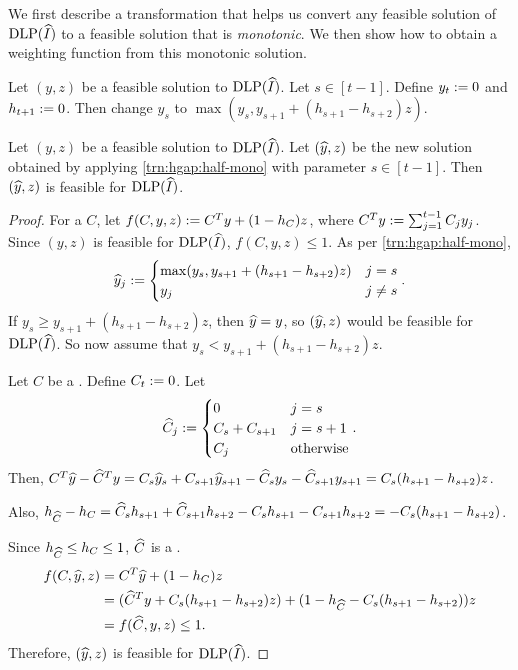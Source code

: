 We first describe a transformation that helps us convert any feasible
solution of $\operatorname{DLP}(\widehat{I})$ to a feasible solution that is \emph{monotonic}.
We then show how to obtain a weighting function from this monotonic solution.

\begin{transformation}
\label{trn:hgap:half-mono}
Let $(y, z)$ be a feasible solution to $\operatorname{DLP}(\widehat{I})$. Let $s \in [t-1]$.
Define $y_t := 0$ and $h_{t+1} := 0$.
Then change $y_s$ to $\max(y_s, y_{s+1} + (h_{s+1} - h_{s+2})z)$.
\end{transformation}
\begin{lemma}
\label{thm:hgap:half-mono-feas}
Let $(y, z)$ be a feasible solution to $\operatorname{DLP}(\widehat{I})$.
Let $(\widehat{y}, z)$ be the new solution obtained by applying \cref{trn:hgap:half-mono}
with parameter $s \in [t-1]$. Then $(\widehat{y}, z)$ is feasible for $\operatorname{DLP}(\widehat{I})$.
\end{lemma}
\begin{proof}
For a \config{} $C$, let $f(C, y, z) := C^Ty + (1-h_C)z$,
where $C^Ty := \sum_{j=1}^{t-1} C_jy_j$.
Since $(y, z)$ is feasible for $\operatorname{DLP}(\widehat{I})$, $f(C, y, z) \le 1$.
As per \cref{trn:hgap:half-mono},
\[ \widehat{y}_j := \begin{cases} \max(y_s, y_{s+1} + (h_{s+1} - h_{s+2})z) & j = s
\\ y_j & j \neq s \end{cases}. \]
If $y_s \ge y_{s+1} + (h_{s+1} - h_{s+2})z$, then $\widehat{y} = y$,
so $(\widehat{y}, z)$ would be feasible for $\operatorname{DLP}(\widehat{I})$.
So now assume that $y_s < y_{s+1} + (h_{s+1} - h_{s+2})z$.

Let $C$ be a \config{}. Define $C_t := 0$. Let
\[ \widehat{C}_j := \begin{cases} 0 & j = s \\ C_s + C_{s+1} & j = s+1
\\ C_j & \textrm{otherwise} \end{cases}. \]
Then, $C^T\widehat{y} - \widehat{C}^Ty
= C_s\widehat{y}_s + C_{s+1}\widehat{y}_{s+1} - \widehat{C}_sy_s - \widehat{C}_{s+1}y_{s+1}
= C_s(h_{s+1} - h_{s+2}) z$.

Also, $h_{\widehat{C}} - h_C
= \widehat{C}_sh_{s+1} + \widehat{C}_{s+1}h_{s+2} - C_sh_{s+1} - C_{s+1}h_{s+2}
= - C_s(h_{s+1} - h_{s+2})$.

Since $h_{\widehat{C}} \le h_C \le 1$, $\widehat{C}$ is a \config{}.
\begin{align*}
f(C, \widehat{y}, z) &= C^T\widehat{y} + (1-h_C)z
\\ &= (\widehat{C}^Ty + C_s(h_{s+1} - h_{s+2})z)
    + (1 - h_{\widehat{C}} - C_s(h_{s+1} - h_{s+2}))z
\\ &= f(\widehat{C}, y, z) \le 1.
\end{align*}
Therefore, $(\widehat{y}, z)$ is feasible for $\operatorname{DLP}(\widehat{I})$.
\end{proof}

